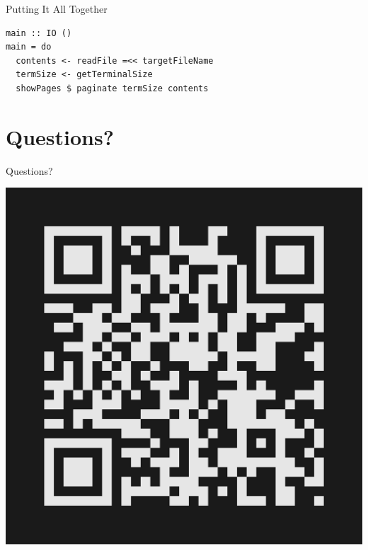 \documentclass[10pt, presentation, colorlinks]{beamer}
\begin{document}
\begin{frame}[label={sec:org5b66db6},fragile]{Putting It All Together}
 \begin{verbatim}
main :: IO ()
main = do
  contents <- readFile =<< targetFileName
  termSize <- getTerminalSize
  showPages $ paginate termSize contents
\end{verbatim}
\end{frame}

\section{Questions?}
\label{sec:orgb806dbe}

\begin{frame}[label={sec:orged88120}]{Questions?}

\bigskip
\begin{center}
\includegraphics[height=0.5\textheight]{./img/typeform-url.png}
\end{center}
\end{frame}
\end{document}
